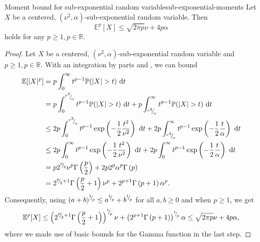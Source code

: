\begin{lemma}{Moment bound for sub-exponential random variable}{sub-exponential-moments}
    Let $X$ be a centered, $(\nu^2, \alpha)$-sub-exponential random variable. Then
    \begin{equation}
        \mathbb{E}^p[X] \leq \sqrt{2 \pi p} \nu + 4 p \alpha
    \end{equation}
    holds for any $p \geq 1, p \in \mathbb{R}$.
\end{lemma}

\begin{proof}
    Let $X$ be a centered, $(\nu^2, \alpha)$-sub-exponential random variable and $p \geq 1, p \in \mathbb{R}$. With an integration by parts and \cite[Proposition 2.9]{wainwright-2019-highdimensional-statistics}, we can bound
    \begin{align}
        \mathbb{E}[|X|^p] 
        &= p \int_{0}^{\infty} t^{p-1} \mathbb{P}(|X| > t)~\mathrm{d}t \notag \\
        &= p \int_{0}^{\sfrac{\nu^2}{ \alpha}} t^{p-1} \mathbb{P}(|X| > t)~\mathrm{d}t + p \int_{\sfrac{\nu^2}{ \alpha}}^{\infty} t^{p-1} \mathbb{P}(|X| > t)~\mathrm{d}t \notag \\
        &\leq 2 p \int_{0}^{\sfrac{\nu^2}{ \alpha}} t^{p-1} \exp\left(-\frac{1}{2} \frac{t^2}{\nu^2} \right)~\mathrm{d}t + 2 p \int_{\sfrac{\nu^2}{ \alpha}}^{\infty} t^{p-1} \exp\left(-\frac{1}{2} \frac{t}{\alpha} \right)~\mathrm{d}t \notag \\
        &\leq 2 p \int_{0}^{\infty} t^{p-1} \exp\left(-\frac{1}{2} \frac{t^2}{\nu^2} \right)~\mathrm{d}t + 2 p \int_{0}^{\infty} t^{p-1} \exp\left(-\frac{1}{2} \frac{t}{\alpha} \right)~\mathrm{d}t \notag \\
        &= p 2^{\sfrac{p}{2}} \nu^p \Gamma\left(\frac{p}{2}\right) + 2 p 2^{p} \alpha^p \Gamma\left(p\right) \notag \\
        &= 2^{\sfrac{p}{2} + 1} \Gamma\left(\frac{p}{2} + 1\right) \nu^p  + 2^{p + 1}  \Gamma\left(p + 1\right) \alpha^p.
        \label{equ:sub-exponential-moment-bound}
    \end{align}
    Consequently, using $(a + b)^{{}^{1}{\mskip -5mu/\mskip -3mu}_{p}} \leq a^{{}^{1}{\mskip -5mu/\mskip -3mu}_{p}} + b^{{}^{1}{\mskip -5mu/\mskip -3mu}_{p}}$ for all $a,b \geq 0$ and when $p \geq 1$, we get
    \begin{equation}
        \mathbb{E}^p[X] 
        \leq \left(2^{{}^{p}{\mskip -5mu/\mskip -3mu}_{2} + 1} \Gamma\left(\frac{p}{2} + 1\right)\right)^{{}^{1}{\mskip -5mu/\mskip -3mu}_{p}} \nu  + \left(2^{p + 1}  \Gamma\left(p + 1\right)\right)^{{}^{1}{\mskip -5mu/\mskip -3mu}_{p}} \alpha
        \leq \sqrt{2 \pi p} \nu  + 4 p \alpha,
    \end{equation}
    where we made use of basic bounds for the Gamma function in the last step.
\end{proof}


